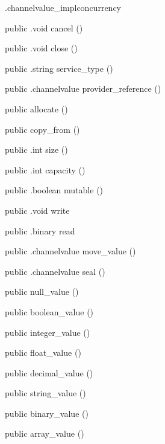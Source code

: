\begin{CrexxClass}{.channelvalue\_impl}{concurrency}
\begin{Members}
    \Method
      {public}
      {.void}
      {cancel}
      {()}

    \Method
      {public}
      {.void}
      {close}
      {()}

    \Method
      {public}
      {.string}
      {service\_type}
      {()}

    \Method
      {public}
      {.channelvalue}
      {provider\_reference}
      {()}

    \Factory
      {public}
      {allocate}
      {()}

    \Factory
      {public}
      {copy\_from}
      {()}

    \Method
      {public}
      {.int}
      {size}
      {()}

    \Method
      {public}
      {.int}
      {capacity}
      {()}

    \Method
      {public}
      {.boolean}
      {mutable}
      {()}

    \Method
      {public}
      {.void}
      {write}
      {}

    \Method
      {public}
      {.binary}
      {read}
      {}

    \Method
      {public}
      {.channelvalue}
      {move\_value}
      {()}

    \Method
      {public}
      {.channelvalue}
      {seal}
      {()}

    \Factory
      {public}
      {null\_value}
      {()}

    \Factory
      {public}
      {boolean\_value}
      {()}

    \Factory
      {public}
      {integer\_value}
      {()}

    \Factory
      {public}
      {float\_value}
      {()}

    \Factory
      {public}
      {decimal\_value}
      {()}

    \Factory
      {public}
      {string\_value}
      {()}

    \Factory
      {public}
      {binary\_value}
      {()}

    \Factory
      {public}
      {array\_value}
      {()}


\end{Members}
\end{CrexxClass}

